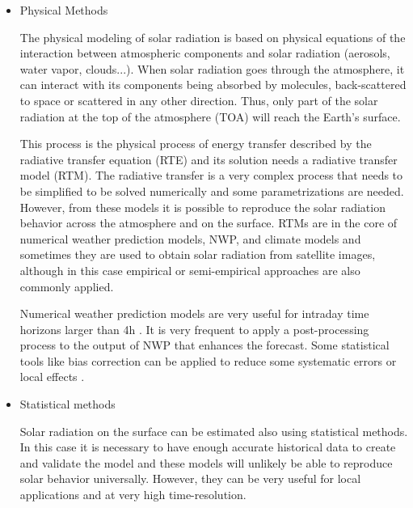 \begin{itemize}
\item{Physical Methods}

The physical modeling of solar radiation is based on physical equations of the interaction between atmospheric components and solar radiation (aerosols, water vapor, clouds...). When solar radiation goes through the atmosphere, it can interact with its components being absorbed by molecules, back-scattered to space or scattered in any other direction. Thus, only part of the solar radiation at the top of the atmosphere (TOA) will reach the Earth's surface.


This process is the physical process of energy transfer described by the radiative transfer equation (RTE) and its solution needs a radiative transfer model (RTM). The radiative transfer is a very complex process that needs to be simplified to be solved numerically and some parametrizations are needed. However, from these models it is possible to reproduce the solar radiation behavior across the atmosphere and on the surface. RTMs are in the core of numerical weather prediction models, NWP, and climate models and sometimes they are used to obtain solar radiation from satellite images, although in this case empirical or semi-empirical approaches are also commonly applied.


Numerical weather prediction models are very useful for intraday time horizons larger than 4h \cite*{Perez2010}. It is very frequent to apply a post-processing process to the output of NWP that enhances the forecast. Some statistical tools like bias correction can be applied to reduce some systematic errors or local effects \cite*{Diagne2013}.


\item{Statistical methods}

Solar radiation on the surface can be estimated also using statistical methods. In this case it is necessary to have enough accurate historical data to create and validate the model and these models will unlikely be able to reproduce solar behavior universally. However, they can be very useful for local applications and at very high time-resolution.


\end{itemize}
